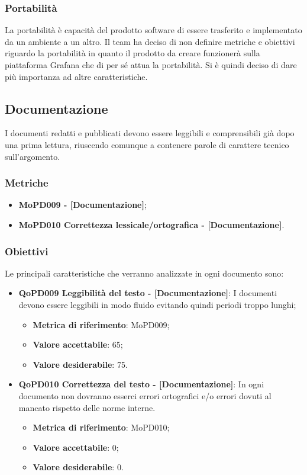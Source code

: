 \documentclass[../piano-di-qualifica.tex]{subfiles}
\begin{document}
\subsubsection{Portabilità}%
\label{sub:portabilita}
La portabilità è capacità del prodotto software di essere trasferito e implementato da un ambiente a un altro.
Il team ha deciso di non definire metriche e obiettivi riguardo la portabilità in quanto il prodotto da creare funzionerà sulla piattaforma Grafana che di per sé attua la portabilità.
Si è quindi deciso di dare più importanza ad altre caratteristiche.

\subsection{Documentazione}%
\label{sub:documentazione}
I documenti redatti e pubblicati devono essere leggibili e comprensibili già dopo una prima lettura, riuscendo comunque a contenere parole di carattere tecnico sull'argomento.

\subsubsection{Metriche}
\label{sub:metriche}
\begin{itemize}
    \item \textbf{MoPD009  - [Documentazione]};
    \item \textbf{MoPD010 Correttezza lessicale/ortografica - [Documentazione]}.
\end{itemize}

\subsubsection{Obiettivi}
\label{sub:obiettivi}
Le principali caratteristiche che verranno analizzate in ogni documento sono:
\begin{itemize}
    \item \textbf{QoPD009 Leggibilità del testo - [Documentazione]}: I documenti devono essere leggibili in modo fluido evitando quindi periodi troppo lunghi;
        \begin{itemize}
            \item \textbf{Metrica di riferimento}: MoPD009;
            \item \textbf{Valore accettabile}: 65;
            \item \textbf{Valore desiderabile}: 75.
        \end{itemize}
    \item \textbf{QoPD010 Correttezza del testo - [Documentazione]}: In ogni documento non dovranno esserci errori ortografici e/o errori dovuti al mancato rispetto delle norme interne.
        \begin{itemize}
            \item \textbf{Metrica di riferimento}: MoPD010;
            \item \textbf{Valore accettabile}: 0;
            \item \textbf{Valore desiderabile}: 0.
        \end{itemize}
\end{itemize}
\end{document}
